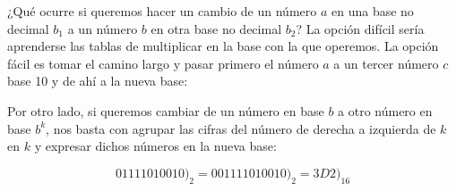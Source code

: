 \begin{center}
\end{center}

¿Qué ocurre si queremos hacer un cambio de un número $a$ en una base no decimal $b_1$ a un número $b$ en otra base no decimal $b_2$?
La opción difícil sería aprenderse las tablas de multiplicar en la base con la que operemos.
La opción fácil es tomar el camino largo y pasar primero el número $a$ a un tercer número $c$ base 10 y de ahí a la nueva base:

\begin{center}
\end{center}

Por otro lado, si queremos cambiar de un número en base $b$ a otro número en base $b^k$, nos basta con agrupar las cifras del número de derecha a izquierda de $k$ en $k$ y expresar dichos números en la nueva base:

\[01111010010\big)_2 = 0011 1101 0010\big)_2 = 3D2\big)_{16}\]
